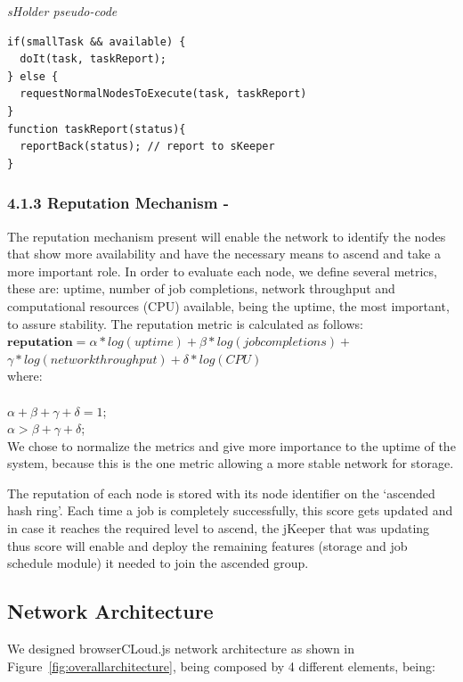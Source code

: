 \textit{sHolder pseudo-code}
\begingroup
\scriptsize
\begin{verbatim}
if(smallTask && available) {
  doIt(task, taskReport);
} else {
  requestNormalNodesToExecute(task, taskReport)
}
function taskReport(status){
  reportBack(status); // report to sKeeper
}
\end{verbatim}
\endgroup

\subsubsection{4.1.3 Reputation Mechanism -}


The reputation mechanism present will enable the network to identify the nodes that show more availability and have the necessary means to ascend and take a more important role. In order to evaluate each node, we define several metrics, these are: uptime, number of job completions, network throughput and computational resources (CPU) available, being the uptime, the most important, to assure stability. The reputation metric is calculated as follows: \\

$ \textbf{reputation} = \alpha * log(uptime) + \beta * log(job completions) + $ \\
$          \gamma * log(network throughput) + \delta * log (CPU)$
\\
where: \\
\\
  $\alpha+ \beta+ \gamma+ \delta = 1$; \\
  $\alpha > \beta + \gamma + \delta$;  \\

We chose to normalize the metrics and give more importance to the uptime of the system, because this is the one metric allowing a more stable network for storage.

The reputation of each node is stored with its node identifier on the `ascended hash ring'. Each time a job is completely successfully, this score gets updated and in case it reaches the required level to ascend, the jKeeper that was updating thus score will enable and deploy the remaining features (storage and job schedule module) it needed to join the ascended group. 

\subsection{Network Architecture}

We designed browserCLoud.js network architecture as shown in Figure~\ref{fig:overallarchitecture}, being composed by 4 different elements, being:

